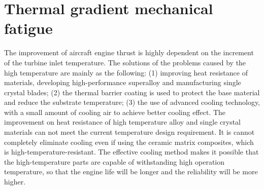 
\section{Thermal gradient mechanical fatigue}
\noindent
The improvement of aircraft engine thrust is highly dependent on the increment of the turbine inlet temperature.
The solutions of the problems caused by the high temperature are mainly as the following:
(1) improving heat resistance of materials, developing high-performance superalloy and manufacturing single crystal blades;
(2) the thermal barrier coating is used to protect the base material and reduce the substrate temperature;
(3) the use of advanced cooling technology, with a small amount of cooling air to achieve better cooling effect.
The improvement on heat resistance of high temperature alloy and single crystal materials can not meet the current temperature design requirement. It is cannot completely eliminate cooling even if using the ceramic matrix composites, which is high-temperature-resistant. The effective cooling method makes it possible that the high-temperature parts are capable of withstanding high operation temperature, so that the engine life will be longer and the reliability will be more higher.

